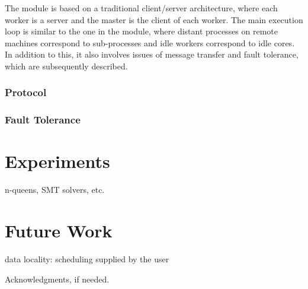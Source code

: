 \documentclass[preprint]{sigplanconf}
\begin{document}
The  module is based on a traditional client/server
architecture, where each worker is a server and the master is the
client of each worker. The main execution loop is similar to the one
in the  module, where distant processes on remote machines
correspond to sub-processes and idle workers correspond to idle
cores. In addition to this, it also involves issues of message
transfer and fault tolerance, which are subsequently described.

\subsubsection{Protocol}

\subsubsection{Fault Tolerance}\label{sec:fault}

\section{Experiments}\label{sec:experiments}

n-queens, SMT solvers, etc.

\section{Future Work}\label{sec:future}

data locality: scheduling supplied by the user



\acks

Acknowledgments, if needed.


\nocite{*}


\end{document}
